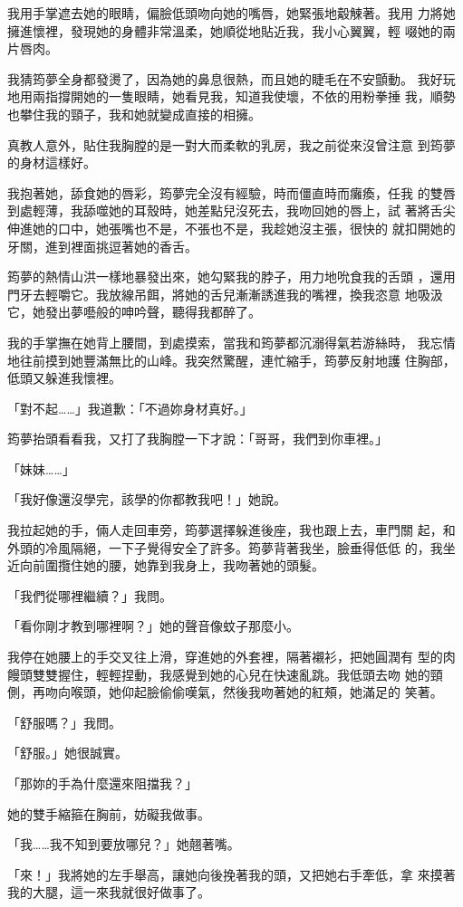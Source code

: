 我用手掌遮去她的眼睛，偏臉低頭吻向她的嘴唇，她緊張地觳觫著。我用
力將她擁進懷裡，發現她的身體非常溫柔，她順從地貼近我，我小心翼翼，輕
啜她的兩片唇肉。

我猜筠夢全身都發燙了，因為她的鼻息很熱，而且她的睫毛在不安顫動。
我好玩地用兩指撐開她的一隻眼睛，她看見我，知道我使壞，不依的用粉拳捶
我，順勢也攀住我的頸子，我和她就變成直接的相擁。

真教人意外，貼住我胸膛的是一對大而柔軟的乳房，我之前從來沒曾注意
到筠夢的身材這樣好。

我抱著她，舔食她的唇彩，筠夢完全沒有經驗，時而僵直時而癱瘓，任我
的雙唇到處輕薄，我舔噬她的耳殼時，她差點兒沒死去，我吻回她的唇上，試
著將舌尖伸進她的口中，她張嘴也不是，不張也不是，我趁她沒主張，很快的
就扣開她的牙關，進到裡面挑逗著她的香舌。

筠夢的熱情山洪一樣地暴發出來，她勾緊我的脖子，用力地吮食我的舌頭
，還用門牙去輕嚼它。我放線吊餌，將她的舌兒漸漸誘進我的嘴裡，換我恣意
地吸汲它，她發出夢囈般的呻吟聲，聽得我都醉了。

我的手掌撫在她背上腰間，到處摸索，當我和筠夢都沉溺得氣若游絲時，
我忘情地往前摸到她豐滿無比的山峰。我突然驚醒，連忙縮手，筠夢反射地護
住胸部，低頭又躲進我懷裡。

「對不起……」我道歉：「不過妳身材真好。」

筠夢抬頭看看我，又打了我胸膛一下才說：「哥哥，我們到你車裡。」

「妹妹……」

「我好像還沒學完，該學的你都教我吧！」她說。

我拉起她的手，倆人走回車旁，筠夢選擇躲進後座，我也跟上去，車門關
起，和外頭的冷風隔絕，一下子覺得安全了許多。筠夢背著我坐，臉垂得低低
的，我坐近向前圍攬住她的腰，她靠到我身上，我吻著她的頭髮。

「我們從哪裡繼續？」我問。

「看你剛才教到哪裡啊？」她的聲音像蚊子那麼小。

我停在她腰上的手交叉往上滑，穿進她的外套裡，隔著襯衫，把她圓潤有
型的肉饅頭雙雙握住，輕輕捏動，我感覺到她的心兒在快速亂跳。我低頭去吻
她的頸側，再吻向喉頭，她仰起臉偷偷嘆氣，然後我吻著她的紅頰，她滿足的
笑著。

「舒服嗎？」我問。

「舒服。」她很誠實。

「那妳的手為什麼還來阻擋我？」

她的雙手縮箍在胸前，妨礙我做事。

「我……我不知到要放哪兒？」她翹著嘴。

「來！」我將她的左手舉高，讓她向後挽著我的頭，又把她右手牽低，拿
來摸著我的大腿，這一來我就很好做事了。

